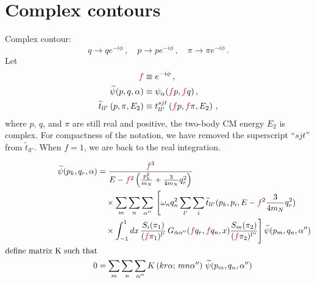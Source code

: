 \documentclass[11pt,aps]{revtex4}
\newcommand{\PF}{{\color{red}f}}
\begin{document}

\section{Complex contours}
Complex contour:
\begin{equation}
  q \to q e^{-i\phi}\, , \quad p \to p e^{-i\phi}\, , \quad \pi \to \pi e^{-i\phi}\, .
\end{equation}
Let
\begin{equation}
  \begin{split}
    \PF &\equiv e^{-i\phi}\, , \\
    \widetilde{\psi}(p, q, \alpha) & \equiv \psi_\alpha(\PF p, \PF q) \, , \\
    \widetilde{t}_{ll'}\left(p, \pi, E_2\right) & \equiv t_{ll'}^{sjt}\left(\PF p, \PF \pi, E_2\right) \, ,
  \end{split}
\end{equation}
where $p$, $q$, and $\pi$ are still real and positive, the two-body CM energy $E_2$ is complex. For compactness of the notation, we have removed the superscript ``$sjt$'' from $\widetilde{t}_{ll'}$. When $f = 1$, we are back to the real integration.

\begin{equation}
\begin{split}
  \widetilde{\psi}(p_{k}, q_r, \alpha) &= \frac{\PF^3}{E - \PF^2 \left(\frac{p_{k}^2}{m_N} + \frac{3}{4m_N}q_r^2 \right)} \\
  & \quad \times \sum_m \sum_{n} \sum_{\alpha''} \, \Bigg{[} \omega_{n} q_n^2 \sum_{l'} \sum_i  \widetilde{t}_{ll'}(p_k, p_i, E - \PF^2 \frac{3}{4m_N}q_r^2)  \\
  & \quad \times \int_{-1}^1{dx}\,  \frac{S_i(\pi_1)}{(\PF\pi_1)^{l'}}\, G_{\bar{\alpha}\alpha''}(\PF q_r, \PF q_n, x)  \frac{S_m(\pi_2)}{(\PF\pi_2)^{l''}} \Bigg{]} \, \widetilde{\psi}(p_m, q_n, \alpha'') \\
  \text{define matrix K such that} \\
  0 & = \sum_m \sum_{n} \sum_{\alpha''} K\left(kr\alpha;\, mn\alpha''\right) \, \widetilde{\psi}(p_m, q_n, \alpha'')
\end{split}
\end{equation}
\end{document}
